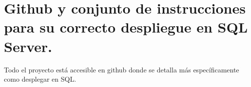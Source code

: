 \documentclass[12pt, a4paper, twoside]{article}
\begin{document}
	


	\section{Github y conjunto de instrucciones para su correcto despliegue en SQL Server.}

	Todo el proyecto está accesible en github \cite{depab2024} donde se detalla más específicamente como desplegar en SQL.
	\printbibliography
	
	
	
	
\end{document}
